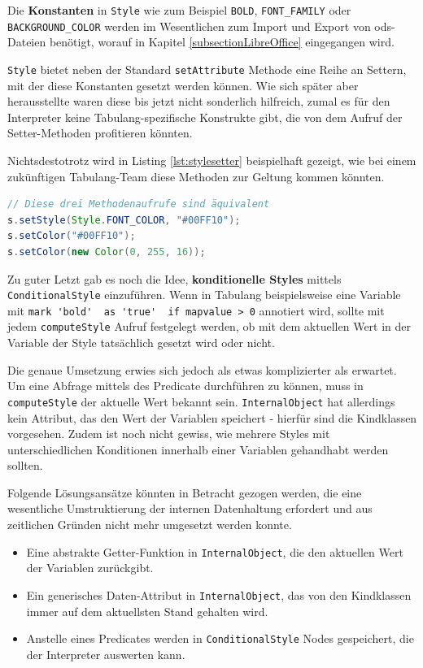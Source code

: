 Die \textbf{Konstanten} in \lstinline{Style} wie zum Beispiel \lstinline{BOLD},
\lstinline{FONT_FAMILY} oder \lstinline{BACKGROUND_COLOR} werden im Wesentlichen
zum Import und Export von ods-Dateien benötigt, worauf in Kapitel \ref{subsectionLibreOffice}
eingegangen wird.

\lstinline{Style} bietet neben der Standard \lstinline{setAttribute} Methode
eine Reihe an Settern, mit der diese Konstanten gesetzt werden können. Wie sich
später aber herausstellte waren diese bis jetzt nicht sonderlich hilfreich, zumal es für
den Interpreter keine Tabulang-spezifische Konstrukte gibt, die von dem Aufruf
der Setter-Methoden profitieren könnten.

Nichtsdestotrotz wird in Listing \ref{lst:stylesetter} beispielhaft gezeigt, wie bei einem zukünftigen
Tabulang-Team diese Methoden zur Geltung kommen könnten.

\begin{lstlisting}[caption={Attribute in der Style-Klasse setzen}, label={lst:stylesetter}, language=Java]
// Diese drei Methodenaufrufe sind äquivalent
s.setStyle(Style.FONT_COLOR, "#00FF10");
s.setColor("#00FF10");
s.setColor(new Color(0, 255, 16));
\end{lstlisting}

Zu guter Letzt gab es noch die Idee, \textbf{konditionelle Styles} mittels
\lstinline{ConditionalStyle} einzuführen. Wenn in Tabulang
beispielsweise eine Variable mit \lstinline{mark 'bold'  as 'true'  if mapvalue > 0} annotiert
wird, sollte mit jedem \lstinline{computeStyle} Aufruf festgelegt werden, ob mit
dem aktuellen Wert in der Variable der Style tatsächlich gesetzt wird oder nicht.

Die genaue Umsetzung erwies sich jedoch als etwas komplizierter als erwartet. Um
eine Abfrage mittels des Predicate durchführen zu können, muss in \lstinline{computeStyle}
der aktuelle Wert bekannt sein. \lstinline{InternalObject} hat allerdings kein
Attribut, das den Wert der Variablen speichert - hierfür sind die Kindklassen vorgesehen.
Zudem ist noch nicht gewiss, wie mehrere Styles mit unterschiedlichen Konditionen innerhalb
einer Variablen gehandhabt werden sollten.

Folgende Lösungsansätze könnten in Betracht gezogen werden, die eine wesentliche Umstruktierung
der internen Datenhaltung erfordert und aus zeitlichen Gründen nicht mehr umgesetzt werden konnte.

\begin{itemize}
    \item Eine abstrakte Getter-Funktion in \lstinline{InternalObject}, die den aktuellen Wert der Variablen zurückgibt.
    \item Ein generisches Daten-Attribut in \lstinline{InternalObject}, das von den Kindklassen immer auf dem aktuellsten Stand gehalten wird.
    \item Anstelle eines Predicates werden in \lstinline{ConditionalStyle} Nodes gespeichert, die der Interpreter auswerten kann.
\end{itemize}

